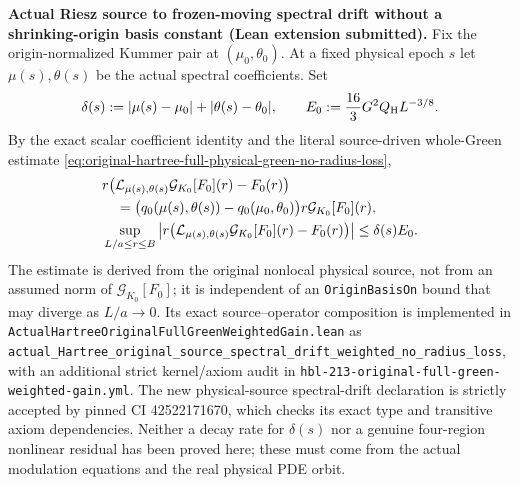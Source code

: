 \documentclass[11pt]{amsart}
\begin{document}
\medskip
\noindent\textbf{Actual Riesz source to frozen-moving spectral drift
without a shrinking-origin basis constant (Lean extension submitted).}
Fix the origin-normalized Kummer pair at $(\mu_0,\theta_0)$.
At a fixed physical epoch $s$ let $\mu(s),\theta(s)$ be the actual
spectral coefficients.  Set
\[
 \delta(s):=|\mu(s)-\mu_0|+|\theta(s)-\theta_0|,\qquad
 E_0:=\frac{16}{3}G^2 Q_{\rm H}L^{-3/8}.
\]
By the exact scalar coefficient identity and the literal source-driven
whole-Green estimate
\eqref{eq:original-hartree-full-physical-green-no-radius-loss},
\begin{align}
 &r\bigl(\mathcal L_{\mu(s),\theta(s)}
      \mathcal G_{K_0}[F_0](r)-F_0(r)\bigr)\notag\\
 &\quad=\bigl(q_0(\mu(s),\theta(s))
              -q_0(\mu_0,\theta_0)\bigr)
          r\mathcal G_{K_0}[F_0](r),\notag\\
 &\sup_{L/a\le r\le B}
 \left|r\bigl(\mathcal L_{\mu(s),\theta(s)}
      \mathcal G_{K_0}[F_0](r)-F_0(r)\bigr)\right|
 \le \delta(s)E_0.
 \label{eq:true-physical-frozen-spectral-drift}
\end{align}
The estimate is derived from the original nonlocal physical source,
not from an assumed norm of $\mathcal G_{K_0}[F_0]$; it is independent
of an \texttt{OriginBasisOn} bound that may diverge as $L/a\to0$.
Its exact source--operator composition is implemented in
\texttt{ActualHartreeOriginalFullGreenWeightedGain.lean}
as
\texttt{actual\_Hartree\_original\_source\_spectral\_drift\_weighted\_no\_radius\_loss},
with an additional strict kernel/axiom audit in
\texttt{hbl-213-original-full-green-weighted-gain.yml}.
The new physical-source spectral-drift declaration is strictly accepted by pinned CI 42522171670, which checks its exact type and transitive axiom dependencies.
Neither a decay rate for $\delta(s)$ nor a genuine four-region
nonlinear residual has been proved here; these must come from the
actual modulation equations and the real physical PDE orbit.
\end{document}
